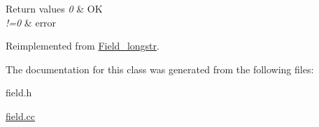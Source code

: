 \begin{DoxyRetVals}{Return values}
{\em 0} & OK \\
\hline
{\em !=0} & error \\
\hline
\end{DoxyRetVals}


Reimplemented from \mbox{\hyperlink{classField__longstr_accc080bab51e57cdcefc594a17cb13f5}{Field\+\_\+longstr}}.



The documentation for this class was generated from the following files\+:\begin{DoxyCompactItemize}
\item 
field.\+h\item 
\mbox{\hyperlink{field_8cc}{field.\+cc}}\end{DoxyCompactItemize}
